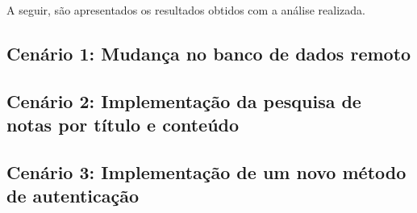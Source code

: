 A seguir, são apresentados os resultados obtidos com a análise realizada.

\subsection{Cenário 1: Mudança no banco de dados remoto}



\subsection{Cenário 2: Implementação da pesquisa de notas por título e conteúdo}



\subsection{Cenário 3: Implementação de um novo método de autenticação}

